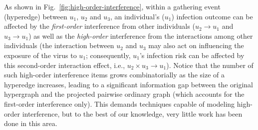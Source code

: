 As shown in Fig.~\ref{fig:high-order-interference}, within a {gathering event} (hyperedge) between $u_1$, $u_2$ and $u_3$, an individual's ($u_1$) {infection outcome} can be affected by the \textit{first-order} interference from other individuals ($u_2\rightarrow u_1$ and $u_3\rightarrow u_1$) as well as the \textit{high-order} interference from the interactions among other individuals (the interaction between $u_2$ and $u_3$ may also act on influencing the exposure of the virus to $u_1$; consequently, $u_1$'s {infection risk} can be affected by this second-order interaction effect, i.e., $u_2\times u_3 \rightarrow u_1$). 
Notice that the number of such high-order interference items grows combinatorially as the size of a hyperedge increases, leading to a significant information gap between the original hypergraph and the projected pairwise ordinary graph (which accounts for the first-order interference only). This demands techniques capable of modeling high-order interference, but to the best of our knowledge, very little work has been done in this area.
    

